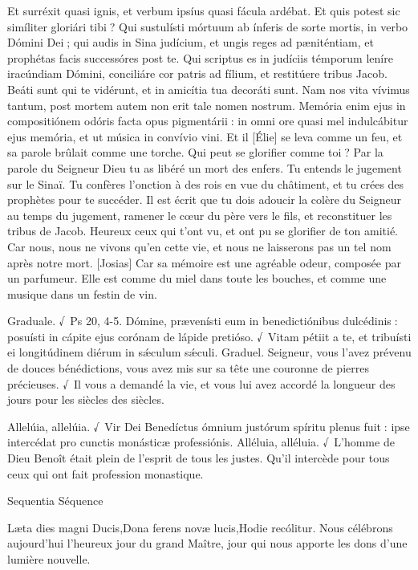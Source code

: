 \begin{paracol}{2}
Et surréxit quasi ignis, et verbum  ipsíus quasi fácula ardébat. Et quis potest sic simíliter gloriári tibi ? Qui sustulísti mórtuum ab ínferis de sorte mortis, in verbo Dómini Dei ; qui audis in Sina judícium, et ungis reges ad pæniténtiam, et prophétas facis successóres post te. Qui scriptus es in judíciis témporum leníre iracúndiam Dómini, conciliáre cor patris ad fílium, et restitúere tribus Jacob. Beáti sunt qui te vidérunt, et in amicítia tua decoráti sunt. Nam nos vita vívimus tantum, post mortem autem non erit tale nomen nostrum. Memória enim ejus in compositiónem odóris facta opus pigmentárii : in omni ore quasi mel indulcábitur ejus memória, et ut música in convívio vini.
\switchcolumn
Et il [Élie] se leva comme un feu, et sa  parole brûlait comme une torche. Qui peut se glorifier comme toi ? Par la parole du Seigneur Dieu tu as libéré un mort des enfers. Tu entends le jugement sur le Sinaï. Tu confères l’onction à des rois en vue du châtiment, et tu crées des prophètes pour te succéder. Il est écrit que tu dois adoucir la colère du Seigneur au temps du jugement, ramener le cœur du père vers le fils, et reconstituer les tribus de Jacob. Heureux ceux qui t’ont vu, et ont pu se glorifier de ton amitié. Car nous, nous ne vivons qu’en cette vie, et nous ne laisserons pas un tel nom après notre mort. [Josias] Car sa mémoire est une agréable odeur, composée par un parfumeur. Elle est comme du miel dans toute les bouches, et comme une musique dans un festin de vin.
\switchcolumn*

Graduale. √~Ps 20, 4-5. Dómine, prævenísti eum in benedictiónibus dulcédinis : posuísti in cápite ejus corónam de lápide pretióso. √~Vitam pétiit a te, et tribuísti ei longitúdinem diérum in sǽculum sǽculi.
\switchcolumn
Graduel. Seigneur, vous l’avez prévenu de douces bénédictions, vous avez mis sur sa tête une couronne de pierres précieuses. √~Il vous a demandé la vie, et vous lui avez accordé la longueur des jours pour les siècles des siècles.
\switchcolumn*

Allelúia, allelúia. √~Vir Dei Benedíctus ómnium justórum spíritu plenus fuit : ipse intercédat pro cunctis monásticæ professiónis.
\switchcolumn
Alléluia, alléluia. √~L’homme de Dieu Benoît était plein de l’esprit de tous les justes. Qu’il intercède pour tous ceux qui ont fait profession monastique.
\switchcolumn*

Sequentia
\switchcolumn
Séquence
\switchcolumn*

Læta dies magni Ducis,Dona ferens novæ lucis,Hodie recólitur.
\switchcolumn
Nous célébrons aujourd’hui l’heureux jour du grand Maître, jour qui nous apporte les dons d’une lumière nouvelle.
\switchcolumn*


\end{paracol}
